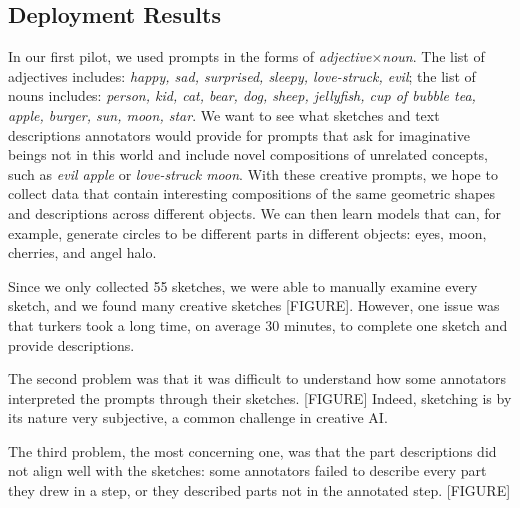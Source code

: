 
\subsection{Deployment Results}
In our first pilot, we used prompts in the forms of \textit{adjective}$\times$\textit{noun}. 
The list of adjectives includes: \textit{happy, sad, surprised, sleepy, love-struck, evil}; the list of nouns includes: 
\textit{person, kid, cat, bear, dog, sheep, jellyfish, cup of bubble tea, apple, burger, sun, moon, star}. 
We want to see what sketches and text descriptions annotators would provide for prompts that ask for imaginative beings not in this world and include novel compositions of unrelated concepts, such as \textit{evil apple} or \textit{love-struck moon}. 
With these creative prompts, we hope to collect data that contain interesting compositions of the same geometric shapes and descriptions across different objects. 
We can then learn models that can, for example, generate circles to be different parts in different objects: eyes, moon, cherries, and angel halo. 

Since we only collected 55 sketches, we were able to manually examine every sketch, and we found many creative sketches [FIGURE]. 
However, one issue was that turkers took a long time, on average 30 minutes, to complete one sketch and provide descriptions. 

The second problem was that it was difficult to understand how some annotators interpreted the prompts through their sketches. [FIGURE]
Indeed, sketching is by its nature very subjective, a common challenge in creative AI.    

The third problem, the most concerning one, was that the part descriptions did not align well with the sketches: some annotators failed to describe every part they drew in a step, or they described parts not in the annotated step. [FIGURE]    


